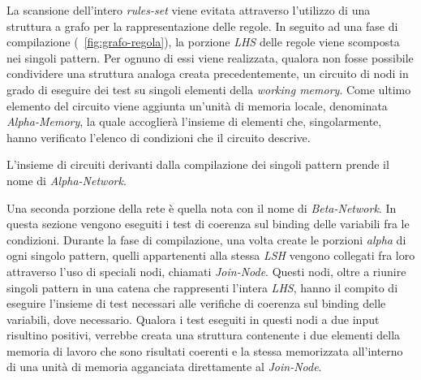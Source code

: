 La scansione dell'intero \emph{rules-set} viene evitata attraverso l'utilizzo di una struttura a grafo per la rappresentazione delle regole. In seguito ad una fase di compilazione (\figurename~\ref{fig:grafo-regola}), la porzione \emph{LHS} delle regole viene scomposta nei singoli pattern. Per ognuno di essi viene realizzata, qualora non fosse possibile condividere una struttura analoga creata precedentemente, un circuito di nodi in grado di eseguire dei test su singoli elementi della \emph{working memory}. Come ultimo elemento del circuito viene aggiunta un'unità di memoria locale, denominata \emph{Alpha-Memory}, la quale accoglierà l'insieme di elementi che, singolarmente, hanno verificato l'elenco di condizioni che il circuito descrive.~\cite{Doorenbos95productionmatching}

L'insieme di circuiti derivanti dalla compilazione dei singoli pattern prende il nome di \emph{Alpha-Network}.

Una seconda porzione della rete è quella nota con il nome di \emph{Beta-Network}. In questa sezione vengono eseguiti i test di coerenza sul binding delle variabili fra le condizioni. Durante la fase di compilazione, una volta create le porzioni \emph{alpha} di ogni singolo pattern, quelli appartenenti alla stessa \emph{LSH} vengono collegati fra loro attraverso l'uso di speciali nodi, chiamati \emph{Join-Node}. Questi nodi, oltre a riunire singoli pattern in una catena che rappresenti l'intera \emph{LHS}, hanno il compito di eseguire l'insieme di test necessari alle verifiche di coerenza sul binding delle variabili, dove necessario. Qualora i test eseguiti in questi nodi a due input risultino positivi, verrebbe creata una struttura contenente i due elementi della memoria di lavoro che sono risultati coerenti e la stessa memorizzata all'interno di una unità di memoria agganciata direttamente al \emph{Join-Node}. 

